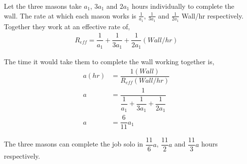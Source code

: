 \begin{solution}[\halfpage]
  Let the three masons take $a_1$, $3a_1$ and $2a_1$ hours individually to complete the wall. The rate at which each mason works is $\frac{1}{a_1}$, $\frac{1}{3a_1}$ and $\frac{1}{2a_1}$ Wall/hr respectively. Together they work at an effective rate of,
  \begin{align}
	R_{eff} = \dfrac{1}{a_1} + \dfrac{1}{3a_1} + \dfrac{1}{2a_1} (Wall/hr)
  \end{align}
  
  The time it would take them to complete the wall working together is,
  \begin{align}
    a(hr) &= \dfrac{1(Wall)}{R_{eff}(Wall/hr)} \\
    a     &= \dfrac{1}{\dfrac{1}{a_1} + \dfrac{1}{3a_1} + \dfrac{1}{2a_1}} \\
    a     &= \dfrac{6}{11}a_1
  \end{align}
  
  The three masons can complete the job solo in $\dfrac{11}{6}a$, $\dfrac{11}{2}a$ and $\dfrac{11}{3}a$ hours respectively.
  
\end{solution}

